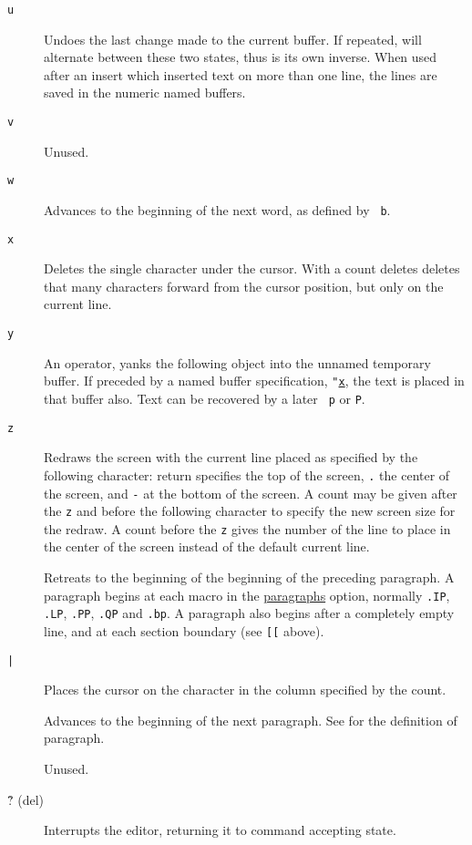 \begin{description}
\item[{\tt u}] Undoes the last change made to the current buffer. If repeated,
will alternate between these two states, thus is its own inverse.  When used
after an insert which inserted text on more than one line, the lines are saved
in the numeric named buffers.

\item[{\tt v}] Unused.

\item[{\tt w}] Advances to the beginning of the next word, as defined by {\tt
b}.

\item[{\tt x}] Deletes the single character under the cursor. With a count
deletes deletes that many characters forward from the cursor position, but
only on the current line.

\item[{\tt y}] An operator, yanks the following object into the unnamed
temporary buffer. If preceded by a named buffer specification, {\tt "\ul{x}},
the text is placed in that buffer also. Text can be recovered by a later {\tt
p} or {\tt P}.

\item[{\tt z}] Redraws the screen with the current line placed as specified by
the following character: {\sc return} specifies the top of the screen, {\tt .}
the center of the screen, and {\tt -} at the bottom of the screen. A count may
be given after the {\tt z} and before the following character to specify the
new screen size for the redraw. A count before the {\tt z} gives the number of
the line to place in the center of the screen instead of the default current
line.

\item[{\tt{}}] Retreats to the beginning of the beginning of the
preceding paragraph. A paragraph begins at each macro in the \ul{paragraphs}
option, normally {\tt .IP}, {\tt .LP}, {\tt .PP}, {\tt .QP} and {\tt .bp}.  A
paragraph also begins after a completely empty line, and at each section
boundary (see {\tt [[} above).

\item[{\tt |}] Places the cursor on the character in the column specified by
the count.

\item[{\tt{}}] Advances to the beginning of the next paragraph. See
{\tt{}} for the definition of paragraph.

\item[{\tt{}}] Unused.

\item[\^{?} {\sc (del)} ] Interrupts the editor, returning it to command
accepting state.

\end{description}


